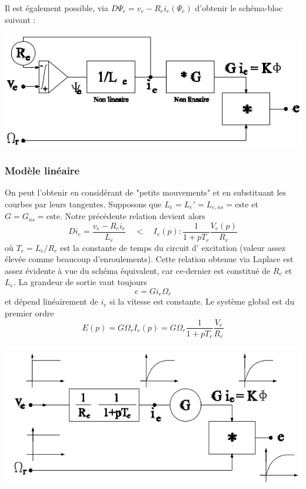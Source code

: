 		Il est également possible, via $D\Psi_e = v_e - R_ei_e(\Psi_e)$ 
		d'obtenir le schéma-bloc suivant :
		\begin{center}
		\includegraphics[scale=0.5]{ch4/image10.png}
		\end{center}			
		
		\subsubsection{Modèle linéaire}
		On peut l'obtenir en considérant de "petits mouvements" et en 
		substituant les courbes par leurs tangentes. Supposons que 
		$L_e = L_e' = L_{e,ns} = \text{cste}$ et $G = G_{ns} = 
		\text{cste}$. Notre précédente relation devient alors 
		\begin{equation}
		Di_e = \frac{v_e - R_ei_e}{L_e} \quad \lt\quad I_e(p) : 
		\frac{1}{1+pT_e}\frac{V_e(p)}{R_e}
		\end{equation}
		où $T_e = L_e/R_e$ est la constante de temps du circuit d'
		excitation (valeur assez élevée comme beaucoup d'enroulements). 
		Cette relation obtenue via Laplace est assez évidente à vue 
		du schéma équivalent, car ce-dernier est constitué de $R_e$ 
		et $L_e$. La grandeur de sortie vaut toujours 
		\begin{equation}
		e = Gi_e\Omega_r
		\end{equation}
		et dépend linéairement de $i_e$ si la vitesse est constante. 
		Le système global est du premier ordre
		\begin{equation}
		E(p) = G\Omega_r I_e(p) = G\Omega_r \dfrac{1}{1+pT_e}\frac{V_e
		}{R_e}
		\end{equation}
		\begin{center}
		\includegraphics[scale=0.5]{ch4/image11.png}
		\end{center}			
		
